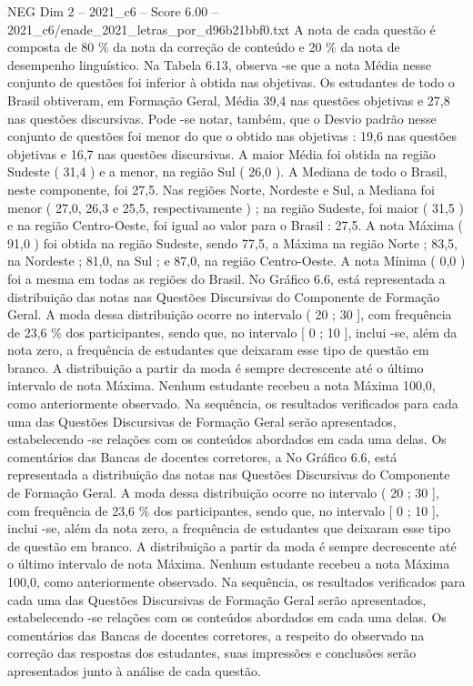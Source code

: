 \begin{textsample}{NEG Dim 2 – 2021\_c6 – Score 6.00 – 2021\_c6/enade\_2021\_letras\_por\_d96b21bbf0.txt}
A nota de cada questão é composta de 80 \% da nota da correção de conteúdo e 20 \% da nota de desempenho linguístico.
Na Tabela 6.13, observa -se que a nota Média nesse conjunto de questões foi inferior à obtida nas objetivas.
Os estudantes de todo o Brasil obtiveram, em Formação Geral, Média 39,4 nas questões objetivas e 27,8 nas questões discursivas.
Pode -se notar, também, que o Desvio padrão nesse conjunto de questões foi menor do que o obtido nas objetivas : 19,6 nas questões objetivas e 16,7 nas questões discursivas.
A maior Média foi obtida na região Sudeste ( 31,4 ) e a menor, na região Sul ( 26,0 ).
A Mediana de todo o Brasil, neste componente, foi 27,5.
Nas regiões Norte, Nordeste e Sul, a Mediana foi menor ( 27,0, 26,3 e 25,5, respectivamente ) ; na região Sudeste, foi maior ( 31,5 ) e na região Centro-Oeste, foi igual ao valor para o Brasil : 27,5.
A nota Máxima ( 91,0 ) foi obtida na região Sudeste, sendo 77,5, a Máxima na região Norte ; 83,5, na Nordeste ; 81,0, na Sul ; e 87,0, na região Centro-Oeste.
A nota Mínima ( 0,0 ) foi a mesma em todas as regiões do Brasil.
No Gráfico 6.6, está representada a distribuição das notas nas Questões Discursivas do Componente de Formação Geral.
A moda dessa distribuição ocorre no intervalo ( 20 ; 30 ], com frequência de 23,6 \% dos participantes, sendo que, no intervalo [ 0 ; 10 ], inclui -se, além da nota zero, a frequência de estudantes que deixaram esse tipo de questão em branco.
A distribuição a partir da moda é sempre decrescente até o último intervalo de nota Máxima.
Nenhum estudante recebeu a nota Máxima 100,0, como anteriormente observado.
Na sequência, os resultados verificados para cada uma das Questões Discursivas de Formação Geral serão apresentados, estabelecendo -se relações com os conteúdos abordados em cada uma delas.
Os comentários das Bancas de docentes corretores, a No Gráfico 6.6, está representada a distribuição das notas nas Questões Discursivas do Componente de Formação Geral.
A moda dessa distribuição ocorre no intervalo ( 20 ; 30 ], com frequência de 23,6 \% dos participantes, sendo que, no intervalo [ 0 ; 10 ], inclui -se, além da nota zero, a frequência de estudantes que deixaram esse tipo de questão em branco.
A distribuição a partir da moda é sempre decrescente até o último intervalo de nota Máxima.
Nenhum estudante recebeu a nota Máxima 100,0, como anteriormente observado.
Na sequência, os resultados verificados para cada uma das Questões Discursivas de Formação Geral serão apresentados, estabelecendo -se relações com os conteúdos abordados em cada uma delas.
Os comentários das Bancas de docentes corretores, a respeito do observado na correção das respostas dos estudantes, suas impressões e conclusões serão apresentados junto à análise de cada questão.

\end{textsample}
